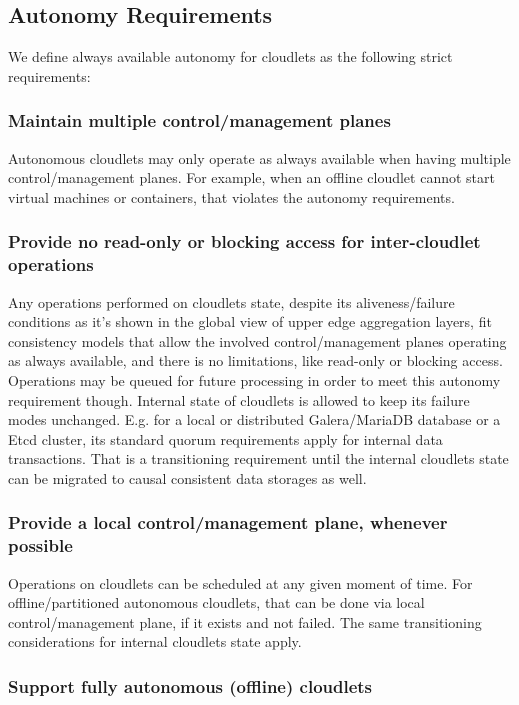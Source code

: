 \documentclass[conference]{IEEEtran}
\begin{document}
\subsection{Autonomy Requirements}

We define always available autonomy for cloudlets as the following strict
requirements:

\subsubsection{Maintain multiple control/management planes}

Autonomous cloudlets may only operate as always available when having multiple
control/management planes. For example, when an offline cloudlet cannot start
virtual machines or containers, that violates the autonomy requirements.

\subsubsection{Provide no read-only or blocking access for inter-cloudlet
operations}

Any operations performed on cloudlets state, despite its aliveness/failure
conditions as it's shown in the global view of upper edge aggregation layers,
fit consistency models that allow the involved control/management planes
operating as always available, and there is no limitations, like read-only or
blocking access. Operations may be queued for future processing in order to
meet this autonomy requirement though. Internal state of cloudlets is allowed
to keep its failure modes unchanged. E.g. for a local or distributed
Galera/MariaDB database or a Etcd cluster, its standard quorum requirements
apply for internal data transactions. That is a transitioning requirement until
the internal cloudlets state can be migrated to causal consistent data storages
as well.

\subsubsection{Provide a local control/management plane, whenever possible}

Operations on cloudlets can be scheduled at any given moment of time. For
offline/partitioned autonomous cloudlets, that can be done via local
control/management plane, if it exists and not failed. The same transitioning
considerations for internal cloudlets state apply.

\subsubsection{Support fully autonomous (offline) cloudlets}
\end{document}
